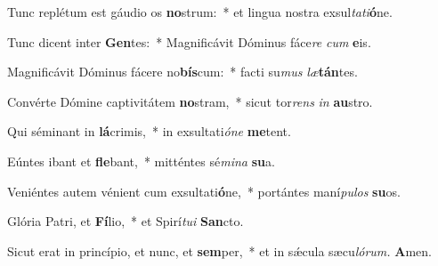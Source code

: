 \item Tunc replétum est gáudio os \textbf{no}strum:~* et lingua nostra exsul\textit{tati}\textbf{ó}ne.
\item Tunc dicent inter \textbf{Gen}tes:~* Magnificávit Dóminus fáce\textit{re} \textit{cum} \textbf{e}is.
\item Magnificávit Dóminus fácere no\textbf{bís}cum:~* facti su\textit{mus} \textit{læ}\textbf{tán}tes.
\item Convérte Dómine ca\-ptivitátem \textbf{no}stram,~* sicut tor\textit{rens} \textit{in} \textbf{au}stro.
\item Qui séminant in \textbf{lá}crimis,~* in exsultati\hspace*{0.01em}\textit{óne} \textbf{me}tent.
\item Eúntes ibant et \textbf{fle}bant,~* mitténtes sé\textit{mina} \textbf{su}a.
\item Veniéntes autem vénient cum exsultati\textbf{ó}ne,~* portántes maní\textit{pulos} \textbf{su}os.
\item Glória Patri, et \textbf{Fí}lio,~* et Spirí\tinyhspace\textit{tui} \textbf{San}cto.
\item Sicut erat in princípio, et nunc, et \textbf{sem}per,~* et in sǽcula sæcu\tinyhspace\textit{lórum.} \textbf{A}men.